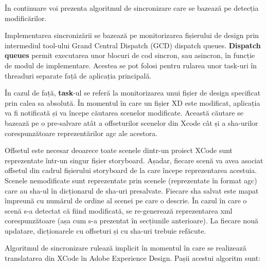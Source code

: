 În continuare voi prezenta algoritmul de sincronizare care se bazează pe detecția modificărilor.

Implementarea sincronizării se bazează pe monitorizarea fișierului de design prin intermediul tool-ului Grand Central Dispatch (GCD) dispatch queues. \textbf{Dispatch queues} permit executarea unor blocuri de cod sincron, sau asincron, în funcție de modul de implementare. Acestea se pot folosi pentru rularea unor task-uri în threaduri separate față de aplicația principală. 

În cazul de față, \textbf{task}-ul se referă la monitorizarea unui fișier de design specificat prin calea sa absolută. În momentul în care un fișier XD este modificat, aplicația va fi notificată și va începe căutarea scenelor modificate. 
Această căutare se bazează pe o pre-salvare atât a offseturilor scenelor din Xcode cât și a sha-urilor corespunzătoare reprezentărilor agc ale acestora. 

Offsetul este necesar deoarece toate scenele dintr-un proiect XCode sunt reprezentate într-un singur fișier storyboard. Așadar, fiecare scenă va avea asociat offsetul din cadrul fișierului storyboard de la care începe reprezentarea acestuia. 
Scenele nemodificate sunt reprezentate prin scenele (reprezentate în format agc) care au sha-ul în dicționarul de sha-uri presalvate. Fiecare sha salvat este mapat împreună cu numărul de ordine al scenei pe care o descrie. 
În cazul în care o scenă s-a detectat că fiind modificată, se re-generează reprezentarea xml corespunzătoare (așa cum s-a prezentat în secțiunile anterioare).  La fiecare nouă updatare, dicționarele cu offseturi și cu sha-uri trebuie refăcute.

Algoritmul de sincronizare rulează implicit în momentul în care se realizează translatarea din XCode în Adobe Experience Design. Pașii acestui algoritm sunt:

